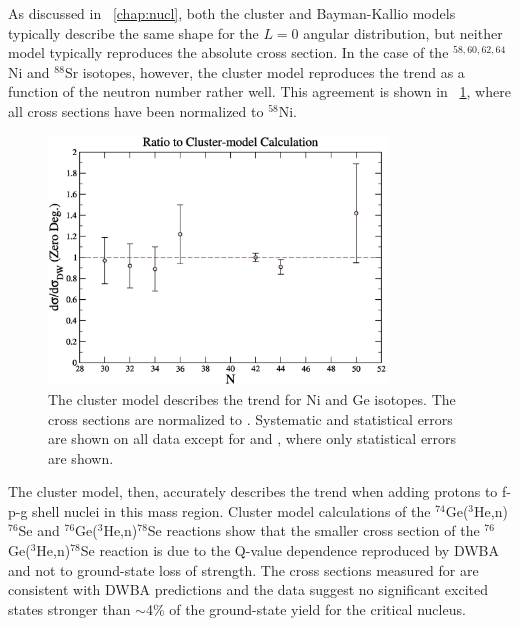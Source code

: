 As discussed in {\chap}~\ref{chap:nucl}, both the cluster and Bayman-Kallio models typically describe the same shape for the $L=0$ angular distribution, but neither model typically reproduces the absolute cross section.  In the case of the $^{58,60,62,64}$Ni and $^{88}$Sr isotopes, however, the cluster model reproduces the trend as a function of the neutron number rather well.  This agreement is shown in {\fig}~\ref{fig:nickelTrend}, where all cross sections have been normalized to $^{58}$Ni.  
\begin{figure}[!htbp]
\centering
\includegraphics[width=0.8\textwidth]{figures/SigmaNormVsN.eps}
\caption[Deviation from the best DWBA fit for other $f-p-g$ isotopes.]{The cluster model describes the trend for Ni and Ge isotopes.  The cross sections are normalized to .  Systematic and statistical errors are shown on all data except for  and , where only statistical errors are shown.}
\label{fig:nickelTrend}
\end{figure}
The cluster model, then, accurately describes the trend when adding protons to f-p-g shell nuclei in this mass region.  Cluster model calculations of the $^{74}$Ge($^3$He,n)$^{76}$Se and $^{76}$Ge($^3$He,n)$^{78}$Se reactions show that the smaller cross section of the $^{76}$Ge($^3$He,n)$^{78}$Se reaction is due to the Q-value dependence reproduced by DWBA and not to ground-state loss of \zp strength.   The cross sections measured for \reaction are consistent with DWBA predictions and the data suggest no significant excited \zp states stronger than $\sim$4\% of the ground-state yield for the critical  nucleus.

%
% 
% 
